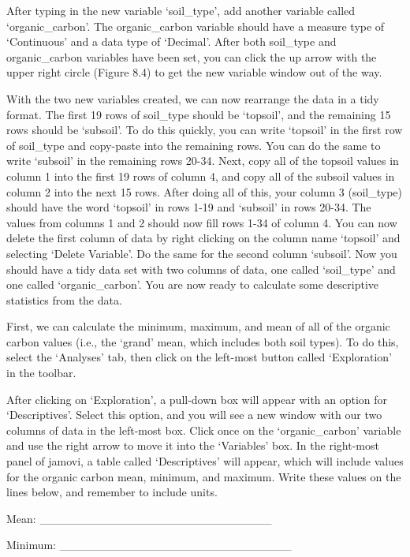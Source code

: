 \documentclass[
  openany]{krantz}
\begin{document}
After typing in the new variable `soil\_type', add another variable called `organic\_carbon'.
The organic\_carbon variable should have a measure type of `Continuous' and a data type of `Decimal'.
After both soil\_type and organic\_carbon variables have been set, you can click the up arrow with the upper right circle (Figure 8.4) to get the new variable window out of the way.

With the two new variables created, we can now rearrange the data in a tidy format.
The first 19 rows of soil\_type should be `topsoil', and the remaining 15 rows should be `subsoil'.
To do this quickly, you can write `topsoil' in the first row of soil\_type and copy-paste into the remaining rows.
You can do the same to write `subsoil' in the remaining rows 20-34.
Next, copy all of the topsoil values in column 1 into the first 19 rows of column 4, and copy all of the subsoil values in column 2 into the next 15 rows.
After doing all of this, your column 3 (soil\_type) should have the word `topsoil' in rows 1-19 and `subsoil' in rows 20-34.
The values from columns 1 and 2 should now fill rows 1-34 of column 4.
You can now delete the first column of data by right clicking on the column name `topsoil' and selecting `Delete Variable'.
Do the same for the second column `subsoil'.
Now you should have a tidy data set with two columns of data, one called `soil\_type' and one called `organic\_carbon'.
You are now ready to calculate some descriptive statistics from the data.

First, we can calculate the minimum, maximum, and mean of all of the organic carbon values (i.e., the `grand' mean, which includes both soil types).
To do this, select the `Analyses' tab, then click on the left-most button called `Exploration' in the toolbar.

After clicking on `Exploration', a pull-down box will appear with an option for `Descriptives'.
Select this option, and you will see a new window with our two columns of data in the left-most box.
Click once on the `organic\_carbon' variable and use the right arrow to move it into the `Variables' box.
In the right-most panel of jamovi, a table called `Descriptives' will appear, which will include values for the organic carbon mean, minimum, and maximum.
Write these values on the lines below, and remember to include units.

Mean: \_\_\_\_\_\_\_\_\_\_\_\_\_\_\_\_\_\_\_\_\_\_\_\_\_\_\_\_

Minimum: \_\_\_\_\_\_\_\_\_\_\_\_\_\_\_\_\_\_\_\_\_\_\_\_\_\_\_\_
\end{document}
